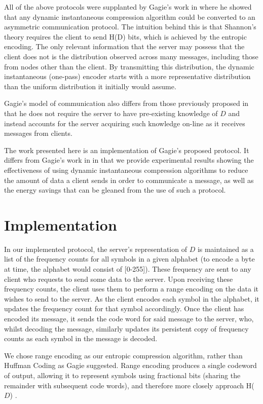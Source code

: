 \documentclass[conference]{IEEEtran}
\begin{document}
All of the above protocols were supplanted by Gagie's work in
\cite{Gagie06} where he showed that any dynamic instantaneous
compression algorithm could be converted to an asymmetric
communication protocol.  The intuition behind this is that Shannon's
theory requires the client to send H(D) bits, which is achieved by the
entropic encoding.  The only relevant information that the server may possess
that the client does not is the distribution observed across many
messages, including those from nodes other than the client.  By
transmitting this distribution, the dynamic instantaneous (one-pass)
encoder starts with a more representative distribution than the
uniform distribution it initially would assume.

Gagie's model of communication also differs from those previously
proposed in that he does not require the server to have pre-existing
knowledge of $D$ and instead accounts for the server acquiring such
knowledge on-line as it receives messages from clients.

The work presented here is an implementation of Gagie's proposed
protocol.  It differs from Gagie's work in \cite{Gagie06} in that we
provide experimental results showing the effectiveness of using
dynamic instantaneous compression algorithms to reduce the amount of
data a client sends in order to communicate a message, as well as the
energy savings that can be gleaned from the use of such a protocol.

\section{Implementation}

In our implemented protocol, the server's representation of $D$ is maintained as
a list of the frequency counts for all symbols in a given alphabet (to encode
a byte at time, the alphabet would consist of [0-255]).  These frequency
are sent to any client who requests to send some data to the server.  Upon 
receiving these frequency counts, the client uses them to perform a range
encoding on the data it wishes to send to the server.  As the client
encodes each symbol in the alphabet, it updates the frequency count for that
symbol accordingly.  Once the client has encoded its message, it sends the
code word for said message to the server, who, whilst decoding the message,
similarly updates its persistent copy of frequency counts as each symbol in
the message is decoded.

We chose range encoding as our entropic compression algorithm, rather
than Huffman Coding as Gagie suggested.  Range encoding produces a
single codeword of output, allowing it to represent symbols using
fractional bits (sharing the remainder with subsequent code words),
and therefore more closely approach H($D$) \cite{range_encoder}.
\end{document}
